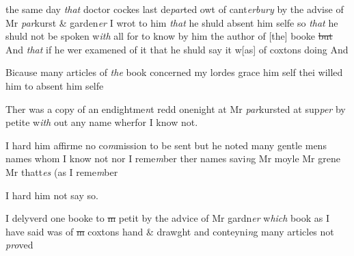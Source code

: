 \documentclass[12pt, a4paper]{book}
\begin{document}
			
		\ifthenelse{\isodd{\thepage}}
		{\reversemarginpar}
		{\normalmarginpar}
		the same day \textit{that} doctor cockes last de\textit{par}ted owt of cant\textit{erbury} by the advise of
Mr \textit{par}kurst \& garden\textit{er} I wrot to him \textit{that} he shuld absent him selfe so \textit{that}
he shuld not be spoken w\textit{ith} all for to know by him the author of [the]
booke \sout{but }And \textit{that} if he wer examened of it that he shuld say it w[as]
of coxtons doing And

				\marginpar[\vspace{0.5cm}{\textcolor{Gray}{15}}]{}
			

		\ifthenelse{\isodd{\thepage}}
		{\reversemarginpar}
		{\normalmarginpar}
		Bicause many articles of \textit{the} book concerned my lordes grace  him self
thei willed him to absent him selfe
			

				\marginpar[\vspace{0.5cm}{\textcolor{Gray}{16}}]{}
			

		\ifthenelse{\isodd{\thepage}}
		{\reversemarginpar}
		{\normalmarginpar}
		Ther was a copy of an endightme\textit{n}t redd onenight at Mr \textit{par}kursted at
sup\textit{per} by petite w\textit{ith} out any name wherfor I know not. 

				\marginpar[\vspace{0.5cm}{\textcolor{Gray}{17. 18.}}]{}
			
		\ifthenelse{\isodd{\thepage}}
		{\reversemarginpar}
		{\normalmarginpar}
		I hard him affirme no co\textit{m}mission to be sent but he noted many
gentle mens names whom I know not nor I reme\textit{m}ber ther names
savi\textit{n}g Mr moyle Mr grene Mr thatt\textit{es} (as I reme\textit{m}ber
			

				\marginpar[\vspace{0.5cm}{\textcolor{Gray}{19. 20.}}]{}
			 
		\ifthenelse{\isodd{\thepage}}
		{\reversemarginpar}
		{\normalmarginpar}
		I hard him not say so.

				\marginpar[\vspace{0.5cm}{\textcolor{Gray}{21}}]{}
			

		\ifthenelse{\isodd{\thepage}}
		{\reversemarginpar}
		{\normalmarginpar}
		I delyverd one booke to \sout{m }petit by the advice of Mr gardn\textit{er} w\textit{hich} book
as I have said was of \sout{m }coxtons hand \& drawght and conteyni\textit{n}g
	many articles not \textit{pro}ved
\end{document}
